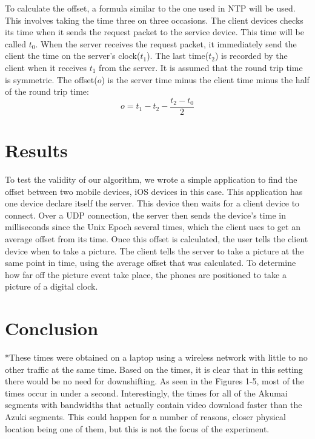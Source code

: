 \documentclass[10pt]{IEEEtran}
\begin{document}

To calculate the offset, a formula similar to the one used in NTP will be used.
This involves taking the time three on three occasions. The client devices
checks its time when it sends the request packet to the service device. This
time will be called $t_0$. When the server receives the request packet, it
immediately send the client the time on the server's clock($t_1$). The last
time($t_2$) is recorded by the client when it receives $t_1$ from the server. 
It is assumed that the round trip time is symmetric. The offset($o$) is the
server time minus the client time minus the half of the round trip time:
\begin{equation}
    o = t_1 - t_2 - \frac{t_2 - t_0}{2} 
\end{equation}

\section{Results}

To test the validity of our algorithm, we wrote a simple application to find 
the offset between two mobile devices, iOS devices in this case. This
application has one device declare itself the server. This device then waits for
a client device to connect. Over a UDP connection, the server then sends the
device's time in milliseconds since the Unix Epoch several times, which the
client uses to get an average offset from its time. Once this offset is
calculated, the user tells the client device when to take a picture. The client
tells the server to take a picture at the same point in time, using the average
offset that was calculated. To determine how far off the picture event take
place, the phones are positioned to take a picture of a digital clock.



\section{Conclusion}

*These times were obtained on a laptop using a wireless network with little to 
no other traffic at the same time. Based on the times, it is clear that in this
setting there would be no need for downshifting. As seen in the Figures 1-5,
most of the times occur in under a second. Interestingly, the times for all of 
the Akumai segments with bandwidths that actually contain video download faster 
than the Azuki segments. This could happen for a number of reasons, closer 
physical location being one of them, but this is not the focus of the 
experiment.
\end{document}
